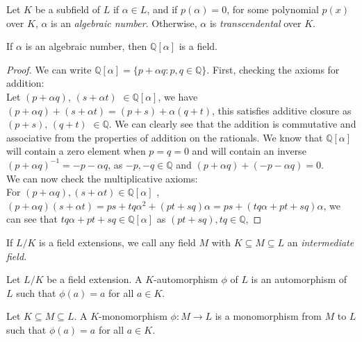 \begin{definition}
Let \(K\) be a subfield of \(L\) if \(\alpha \in L\), and if \(p(\alpha)=0\), for some polynomial \(p(x)\) over \(K\), \(\alpha\) is an \textit{algebraic number}. Otherwise, \(\alpha\) is \textit{transcendental} over \(K\).
\end{definition}
\begin{theorem}
If \(\alpha\) is an algebraic number, then \(\mathbb{Q}[\alpha]\) is a field.
\end{theorem}
\begin{proof}
We can write \(\mathbb{Q}[\alpha] = \{p + \alpha q : p,q \in \mathbb{Q}\}\). First, checking the axioms for addition: \\
Let \((p + \alpha q)\),  \((s + \alpha t)\) \(\in \mathbb{Q}[\alpha]\), we have \((p + \alpha q) + (s +\alpha t) = (p + s) + \alpha(q + t)\), this satisfies additive closure as \((p+s)\), \((q+t)\) \(\in\mathbb{Q}\). We can clearly see that the addition is commutative and associative from the properties of addition on the rationals. We know that \(\mathbb{Q}[\alpha]\) will contain a zero element when \(p = q = 0\) and will contain an inverse \((p + \alpha q)^{-1} = -p - \alpha q\), as \(-p, -q\in \mathbb{Q}\) and \((p + \alpha q) + (-p - \alpha q) = 0\). \\
We can now check the multiplicative axioms:\\
For \((p + \alpha q) , (s + \alpha t ) \in \mathbb{Q}[\alpha]\) , \((p + \alpha q)(s + \alpha t) = ps + tq \alpha^2 + (pt + sq) \alpha = ps + (tq \alpha + pt + sq) \alpha\), we can see that \(tq \alpha + pt + sq \in\mathbb{Q}[\alpha]\) as \((pt + sq), tq \in \mathbb{Q}\),
\end{proof}


\begin{definition}
    If $L/K$ is a field extensions, we call any field $M$ with $K \subseteq M \subseteq L$ an \textit{intermediate field.}
\end{definition}

\begin{definition} \label{def:automorphism}
	Let $L/K$ be a field extension. A $K$-automorphism $\phi$ of $L$ is an automorphism of $L$ such that $\phi(a) = a$ for all $a \in K$. 
\end{definition}

\begin{definition}
	Let $K \subseteq M \subseteq L$. A $K$-monomorphism $\phi : M \to L$ is a monomorphism from $M$ to $L$ such that $\phi(a) = a$ for all $a \in K$. 
\end{definition}



